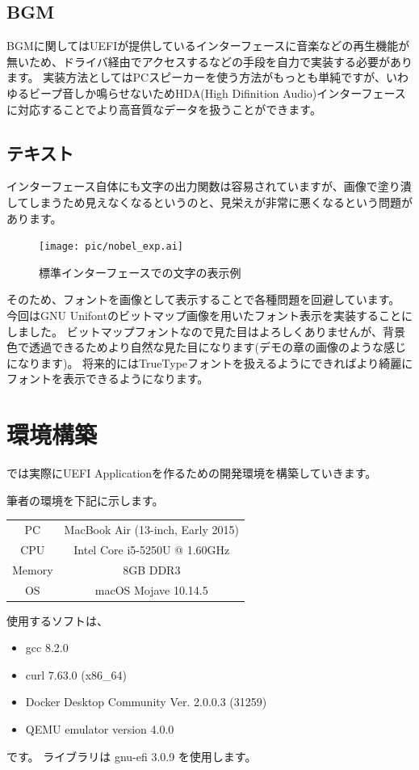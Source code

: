 \documentclass[10pt, b5paper, openany]{ltjsbook}
\begin{document}
\section{BGM}
BGMに関してはUEFIが提供しているインターフェースに音楽などの再生機能が無いため、ドライバ経由でアクセスするなどの手段を自力で実装する必要があります。
実装方法としてはPCスピーカーを使う方法がもっとも単純ですが、いわゆるビープ音しか鳴らせないためHDA(High Difinition Audio)インターフェースに対応することでより高音質なデータを扱うことができます。

\section{テキスト}
インターフェース自体にも文字の出力関数は容易されていますが、画像で塗り潰してしまうため見えなくなるというのと、見栄えが非常に悪くなるという問題があります。
\begin{figure}[H]
    \centering
    \texttt{[image: pic/nobel\_exp.ai]}
    \caption{標準インターフェースでの文字の表示例}
    \label{fig:text}
\end{figure}
そのため、フォントを画像として表示することで各種問題を回避しています。
今回はGNU Unifontのビットマップ画像を用いたフォント表示を実装することにしました。
ビットマップフォントなので見た目はよろしくありませんが、背景色で透過できるためより自然な見た目になります(デモの章の画像のような感じになります)。
将来的にはTrueTypeフォントを扱えるようにできればより綺麗にフォントを表示できるようになります。

\chapter{環境構築}
では実際にUEFI Applicationを作るための開発環境を構築していきます。

筆者の環境を下記に示します。
\begin{table}[H]
    \centering
    \begin{tabular}{|c|c|}
        \hline
        PC & MacBook Air (13-inch, Early 2015) \\
        CPU & Intel Core i5-5250U @ 1.60GHz \\
        Memory & 8GB DDR3 \\
        OS & macOS Mojave 10.14.5 \\
        \hline
    \end{tabular}
\end{table}
使用するソフトは、
\begin{itemize}
    \item gcc 8.2.0
    \item curl 7.63.0 (x86\_64)
    \item Docker Desktop Community Ver. 2.0.0.3 (31259)
    \item QEMU emulator version 4.0.0
\end{itemize}
です。
ライブラリは gnu-efi 3.0.9 を使用します。
\end{document}
